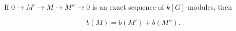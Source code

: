 If $0 \to M' \to M \to M'' \to 0$ is an exact sequence of $k[G]$-modules, then

$$b(M) = b(M') + b(M'').$$
